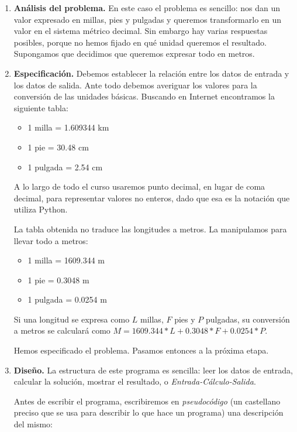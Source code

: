 \begin{enumerate}
\item {\bf Análisis del problema.} En este caso el problema es
sencillo: nos dan un valor expresado en millas, pies y pulgadas y
queremos transformarlo en un valor en el sistema métrico decimal.
Sin embargo hay varias respuestas posibles, porque no hemos fijado
en qué unidad queremos el resultado. Supongamos que decidimos que
queremos expresar todo en metros.

\item {\bf Especificación.} Debemos establecer la relación entre
los datos de entrada y los datos de salida. Ante todo debemos
averiguar los valores para la conversión de las unidades básicas.
Buscando en Internet encontramos la siguiente tabla:

\begin{itemize}
\item 1 milla = 1.609344 km
\item 1 pie = 30.48 cm
\item 1 pulgada = 2.54 cm
\end{itemize}

\begin{atencion}
A lo largo de todo el curso usaremos punto decimal,
en lugar de coma decimal, para representar valores no enteros,
dado que esa es la notación que utiliza Python.
\end{atencion}

La tabla obtenida no traduce las longitudes a metros. La manipulamos para
llevar todo a metros:

\begin{itemize}
\item 1 milla = 1609.344 m
\item 1 pie = 0.3048 m
\item 1 pulgada = 0.0254 m
\end{itemize}

Si una longitud se expresa como $L$ millas, $F$ pies y $P$ pulgadas, su
conversión a metros se calculará como 
$M = 1609.344 * L + 0.3048 * F + 0.0254 * P.$

Hemos especificado el problema. Pasamos entonces a la próxima etapa.

\item {\bf Diseño.} La estructura de este programa es sencilla:
leer los datos de entrada, calcular la solución, mostrar el
resultado, o {\it Entrada-Cálculo-Salida}.

Antes de escribir el programa, escribiremos en {\it pseudocódigo}
(un castellano preciso que se usa para describir lo que hace un
programa) una descripción del mismo:


\end{enumerate}

